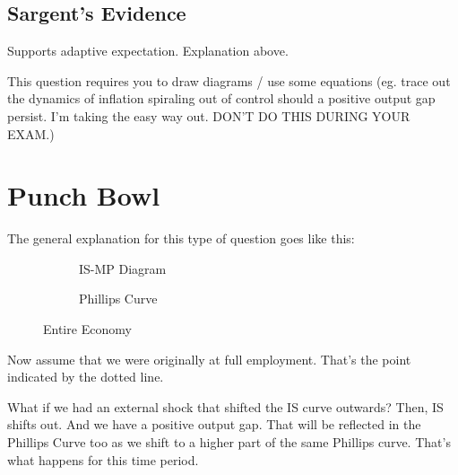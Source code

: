 \documentclass[11pt]{scrartcl}
\newcommand{\og}{\ensuremath{\tilde{Y}}}
\begin{document}
\subsection{Sargent's Evidence}

Supports adaptive expectation. Explanation above.

This question requires you to draw diagrams / use some equations (eg. trace out the dynamics of inflation spiraling out of control should a positive output gap persist. I'm taking the easy way out. DON'T DO THIS DURING YOUR EXAM.)

\section{Punch Bowl}

The general explanation for this type of question goes like this:

\begin{figure}[H]
\begin{subfigure}[b]{0.5\textwidth}
\centering
{}
\caption{\color{blue}IS-\color{black}MP Diagram}
\end{subfigure}
\hspace{2ex}
\begin{subfigure}[b]{0.5\textwidth}
\centering
{}
\caption{Phillips Curve}
\end{subfigure}
\caption{Entire Economy}
\end{figure}

Now assume that we were originally at full employment. That's the point indicated by the dotted line.

What if we had an external shock that shifted the IS curve outwards? Then, IS shifts out. And we have a positive output gap. That will be reflected in the Phillips Curve too as we shift to a higher part of the same Phillips curve. That's what happens for this time period.
\end{document}
